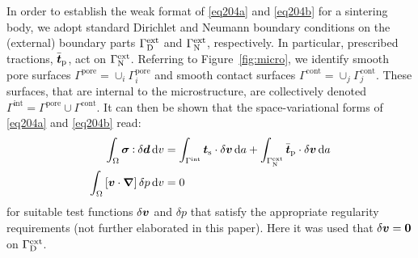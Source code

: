 \documentclass[10pt,a4paper]{article}
\newcommand{\figref}[1]{Figure~\ref{#1}}
\newcommand{\pore}{\mathrm{pore}}
\newcommand{\prescribed}{\mathrm{p}}
\newcommand{\contact}{\mathrm{cont}}
\newcommand{\external}{\mathrm{ext}}
\newcommand{\internal}{\mathrm{int}}
\newcommand{\surf}{\mathrm{s}}
\begin{document}
In order to establish the weak format of \eqref{eq204a} and \eqref{eq204b} for a sintering body, we adopt standard Dirichlet and Neumann boundary conditions on the (external) boundary parts $\Gamma^\external_\Dirichlet$ and $\Gamma^\external_\Neumann$, respectively. In particular, prescribed tractions, $\bar{\ta t}_\prescribed$, act on $\Gamma^\external_\Neumann$. Referring to \figref{fig:micro}, we identify smooth pore surfaces $\Gamma^\pore=\cup_i\Gamma^\pore_i$ and smooth contact surfaces $\Gamma^\contact=\cup_j\Gamma^\contact_j$. These surfaces, that are internal to the microstructure, are collectively denoted $\Gamma^\internal=\Gamma^\pore\cup\Gamma^\contact$. It can then be shown that the space-variational forms of \eqref{eq204a} and \eqref{eq204b} read:
\begin{align}
    \int_{\Omega} \ts{\sigma}\dprod\delta \ts{d} \dif v
    & =
    \int_{\Gamma^\internal} \ta{t}_\surf \cdot \delta\ta{v} \dif a
    + \int_{\Gamma^\external_\Neumann} \bar{\ta t}_\prescribed\cdot\delta \ta{v} \dif a
\label{eq205a} \\
    \int_{\Omega} \left[\ta{v}\cdot\diff\right] \delta p \dif v
    & =  0
\label{eq205b}
\end{align}
for suitable test functions $\delta\boldsymbol{v}$ and $\delta p$ that satisfy the appropriate regularity requirements (not further elaborated in this paper). Here it was used that $\delta\boldsymbol{v}=\boldsymbol{0}$ on $\Gamma^\external_\Dirichlet$.
\end{document}
